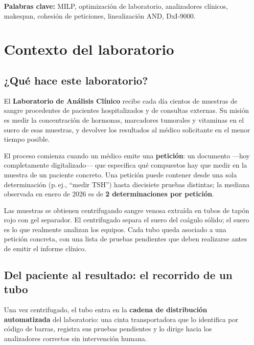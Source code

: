 \documentclass[12pt, a4paper]{article}
\begin{document}
\medskip
\noindent\textbf{Palabras clave:} MILP, optimización de laboratorio, analizadores clínicos,
makespan, cohesión de peticiones, linealización AND, DxI-9000.

\vfill

\clearpage
\thispagestyle{empty}
\tableofcontents

\clearpage
\section{Contexto del laboratorio}

\subsection{¿Qué hace este laboratorio?}

El \textbf{Laboratorio de Análisis Clínico} recibe cada día cientos de muestras de sangre
procedentes de pacientes hospitalizados y de consultas externas. Su misión es medir la
concentración de hormonas, marcadores tumorales y vitaminas en el suero de esas muestras,
y devolver los resultados al médico solicitante en el menor tiempo posible.

El proceso comienza cuando un médico emite una \textbf{petición}: un documento —hoy
completamente digitalizado— que especifica qué compuestos hay que medir en la muestra de
un paciente concreto. Una petición puede contener desde una sola determinación
(p.\,ej., ``medir TSH'') hasta diecisiete pruebas distintas; la mediana observada en enero
de 2026 es de \textbf{2 determinaciones por petición}.

Las muestras se obtienen centrifugando sangre venosa extraída en tubos de tapón rojo con
gel separador. El centrifugado separa el suero del coágulo sólido; el suero es lo que
realmente analizan los equipos. Cada tubo queda asociado a una petición concreta, con una
lista de pruebas pendientes que deben realizarse antes de emitir el informe clínico.

\subsection{Del paciente al resultado: el recorrido de un tubo}

Una vez centrifugado, el tubo entra en la \textbf{cadena de distribución automatizada} del
laboratorio: una cinta transportadora que lo identifica por código de barras, registra sus
pruebas pendientes y lo dirige hacia los analizadores correctos sin intervención humana.
\end{document}
